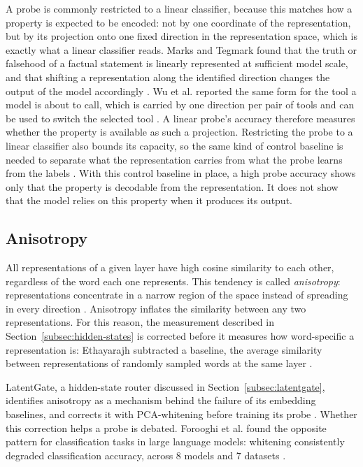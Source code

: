 A probe is commonly restricted to a linear classifier, because this matches how a property is expected to be encoded: not by one coordinate of the representation, but by its projection onto one fixed direction in the representation space, which is exactly what a linear classifier reads. Marks and Tegmark found that the truth or falsehood of a factual statement is linearly represented at sufficient model scale, and that shifting a representation along the identified direction changes the output of the model accordingly \cite{marksGeometryTruthEmergent2024}. Wu et al. reported the same form for the tool a model is about to call, which is carried by one direction per pair of tools and can be used to switch the selected tool \cite{wuToolCallingLinearly2026}. A linear probe's accuracy therefore measures whether the property is available as such a projection. Restricting the probe to a linear classifier also bounds its capacity, so the same kind of control baseline is needed to separate what the representation carries from what the probe learns from the labels \cite{belinkovProbingClassifiersPromises2021a}. With this control baseline in place, a high probe accuracy shows only that the property is decodable from the representation. It does not show that the model relies on this property when it produces its output.

\subsection{Anisotropy}
\label{subsec:anisotropy}

All representations of a given layer have high cosine similarity to each other, regardless of the word each one represents. This tendency is called \emph{anisotropy}: representations concentrate in a narrow region of the space instead of spreading in every direction \cite{ethayarajhHowContextualAre2019}. Anisotropy inflates the similarity between any two representations. For this reason, the measurement described in Section~\ref{subsec:hidden-states} is corrected before it measures how word-specific a representation is: Ethayarajh subtracted a baseline, the average similarity between representations of randomly sampled words at the same layer \cite{ethayarajhHowContextualAre2019}.

LatentGate, a hidden-state router discussed in Section~\ref{subsec:latentgate}, identifies anisotropy as a mechanism behind the failure of its embedding baselines, and corrects it with PCA-whitening before training its probe \cite{ratnakarLatentGateLowLatencySemantic2026}. Whether this correction helps a probe is debated. Forooghi et al. found the opposite pattern for classification tasks in large language models: whitening consistently degraded classification accuracy, across 8 models and 7 datasets \cite{forooghiWhiteningNotRecommended2024}.

